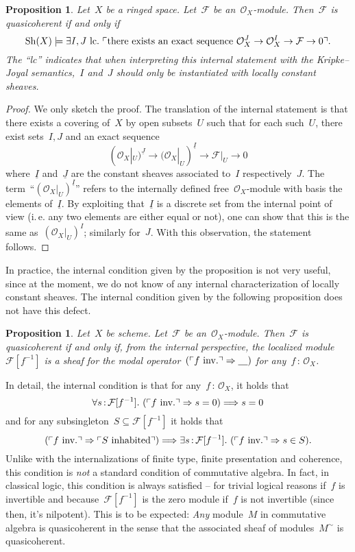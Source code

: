 \documentclass[10pt]{amsart}
\theoremstyle{definition}
\theoremstyle{plain}
\newtheorem{prop}[defn]{Proposition}
\theoremstyle{remark}
\newcommand{\F}{\mathcal{F}}
\renewcommand{\O}{\mathcal{O}}
\newcommand{\placeholder}{\underline{\quad}}
\newcommand{\ul}[1]{\underline{#1}}
\newcommand{\Sh}{\mathrm{Sh}}
\newcommand{\?}{\,{:}\,}
\renewcommand{\_}{\mathpunct{.}\,}
\newcommand{\speak}[1]{\ulcorner\text{\textnormal{#1}}\urcorner}
\begin{document}
\begin{prop}Let~$X$ be a ringed space. Let~$\F$ be an~$\O_X$-module. Then~$\F$
is quasicoherent if and only if
\[ \Sh(X) \models \exists I,J\ \mathrm{lc}\_ \speak{there exists an
  exact sequence~$\O_X^J \to \O_X^I \to \F \to 0$}. \]
The ``\textnormal{lc}'' indicates that when interpreting this internal statement with the
Kripke--Joyal semantics,~$I$ and~$J$ should only be instantiated with
\emph{locally constant} sheaves.
\end{prop}
\begin{proof} We only sketch the proof.
The translation of the internal statement is that there exists a covering
of~$X$ by open subsets~$U$ such that for each such~$U$, there exist sets~$I,J$
and an exact sequence
\[ (\O_X|_U)^{\ul{J}} \longrightarrow (\O_X|_U)^{\ul{I}} \longrightarrow \F|_U
\longrightarrow 0 \]
where~$\ul{I}$ and~$\ul{J}$ are the constant sheaves associated to~$I$
respectively~$J$. The term~``$(\O_X|_U)^{\ul{I}}$'' refers to the internally
defined free~$\O_X$-module with basis the elements of~$\ul{I}$. By exploiting
that~$\ul{I}$ is a discrete set from the internal point of view (i.\,e. any two
elements are either equal or not), one can show that this is the same
as~$(\O_X|_U)^I$; similarly for~$J$. With this observation, the statement
follows.
\end{proof}

In practice, the internal condition given by the proposition is not very
useful, since at the moment, we do not know of any internal characterization of
locally constant sheaves. The internal condition given by the following
proposition does not have this defect.

\begin{prop}\label{qcoh:sheafchar}
Let~$X$ be scheme. Let~$\F$ be an~$\O_X$-module. Then~$\F$ is
quasicoherent if and only if, from the internal perspective, the localized
module~$\F[f^{-1}]$ is a sheaf for the modal operator~$(\speak{$f$ inv.}
\Rightarrow \placeholder)$ for any~$f\?\O_X$.
\end{prop}

In detail, the internal condition is that for any~$f\?\O_X$, it holds that
\[ \forall s\?\F[f^{-1}]\_
  (\speak{$f$ inv.} \Rightarrow s = 0) \Longrightarrow s = 0 \]
and for any subsingleton~$S \subseteq \F[f^{-1}]$ it holds that
\[ (\speak{$f$ inv.} \Rightarrow \speak{$S$ inhabited}) \Longrightarrow
  \exists s\?\F[f^{-1}]\_
  (\speak{$f$ inv.} \Rightarrow s \in S). \]
Unlike with the internalizations of finite type, finite presentation and
coherence, this condition is \emph{not} a standard condition of commutative
algebra. In fact, in classical logic, this condition is always satisfied --
for trivial logical reasons if~$f$ is invertible and because~$\F[f^{-1}]$ is
the zero module if~$f$ is not invertible (since then, it's nilpotent). This is
to be expected: \emph{Any} module~$M$ in commutative algebra is quasicoherent in
the sense that the associated sheaf of modules~$M^\sim$ is quasicoherent.
\end{document}
